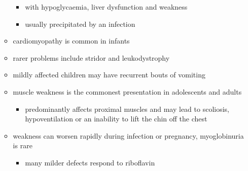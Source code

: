 \documentclass{scrartcl}
\begin{document}
\begin{enumerate}
\begin{itemize}
\begin{itemize}
\item with hypoglycaemia, liver dysfunction and weakness
\item usually precipitated by an infection
\end{itemize}
\item cardiomyopathy is common in infants
\item rarer problems include stridor and leukodystrophy
\item mildly affected children may have recurrent bouts of vomiting
\item muscle weakness is the commonest presentation in adolescents and adults
\begin{itemize}
\item predominantly affects proximal muscles and may lead to scoliosis,
hypoventilation or an inability to lift the chin off the chest
\end{itemize}
\item weakness can worsen rapidly during infection or pregnancy, myoglobinuria is rare
\begin{itemize}
\item many milder defects respond to riboflavin
\end{itemize}
\end{itemize}
\end{enumerate}
\end{document}
